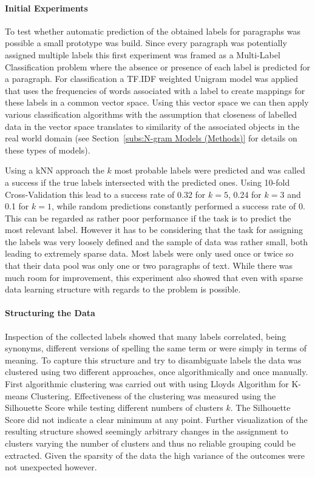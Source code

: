 \paragraph{Initial Experiments}
\label{par:Initial Experiments}

To test whether automatic prediction of the obtained labels for paragraphs was possible a small prototype was build. Since every paragraph was potentially assigned multiple labels this first experiment was framed as a \gls{Multi-Label Classification} problem where the absence or presence of each label is predicted for a paragraph. For classification a TF.IDF weighted Unigram model was applied that uses the frequencies of words associated with a label to create mappings for these labels in a common vector space. Using this vector space we can then apply various classification algorithms with the assumption that closeness of labelled data in the vector space translates to similarity of the associated objects in the real world domain (see Section~\ref{subs:N-gram Models (Methods)} for details on these types of models).

Using a \gls{kNN} approach the $k$ most probable labels were predicted and was called a success if the true labels intersected with the predicted ones. Using 10-fold \gls{Cross-Validation} this lead to a success rate of 0.32 for $k=5$, 0.24 for $k=3$ and 0.1 for $k=1$, while random predictions constantly performed a success rate of 0. This can be regarded as rather poor performance if the task is to predict the most relevant label. However it has to be considering that the task for assigning the labels was very loosely defined and the sample of data was rather small, both leading to extremely sparse data. Most labels were only used once or twice so that their data pool was only one or two paragraphs of text. While there was much room for improvement, this experiment also showed that even with sparse data learning structure with regards to the problem is possible.

\paragraph{Structuring the Data}
\label{par:Structuring the Data}

Inspection of the collected labels showed that many labels correlated, being synonyms, different versions of spelling the same term or were simply in terms of meaning. To capture this structure and try to disambiguate labels the data was clustered using two different approaches, once algorithmically and once manually. First algorithmic clustering was carried out with using \gls{Lloyds Algorithm} for \gls{K-means Clustering}. Effectiveness of the clustering was measured using the \gls{Silhouette Score} while testing different numbers of clusters $k$. The Silhouette Score did not indicate a clear minimum at any point. Further visualization of the resulting structure showed seemingly arbitrary changes in the assignment to clusters varying the number of clusters and thus no reliable grouping could be extracted.
Given the sparsity of the data the high variance of the outcomes were not unexpected however.

